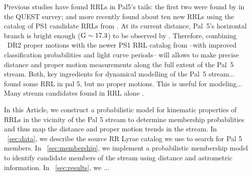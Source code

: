 \documentclass[twocolumn]{aastex63}
\begin{document}
Previous studies have found RRLs in Pal5's tails: the first two were found by \citet{Vivas:2001} in the QUEST survey; and more recently \citep{Ibata:2017} found about ten new RRLs using the catalog of PS1 candidate RRLs from \citet{Hernitschek:2016}. At its current distance, Pal~5's horizontal branch is bright enough (${\mathrm{G}}\sim17.3$) to be observed by \Gaia. Therefore, combining \Gaia~DR2 proper motions with the newer PS1 RRL catalog from \citet{Sesar:2017b} --with improved classification probabilities and light curve periods--  will allows to make precise distance and proper motion measurements along the full extent of the Pal~5 stream. Both, key ingredients for dynamical modelling of the Pal~5 stream...
\citep{Ibata:2017} found some RRL in pal 5, but no proper motions.
This is useful for modeling...
Many stream candidates found in RRL alone \citep{Mateu:2018}.


In this Article, we construct a probabilistic model for kinematic properties of RRLs in the vicinity of the Pal 5 stream to determine membership probabilities and thus map the distance and proper motion trends in the stream.
In \sectionname~\ref{sec:data}, we describe the source RR Lyrae catalog we use to search for Pal 5 members.
In \sectionname~\ref{sec:membership}, we implement a probabilistic membership model to identify candidate members of the stream using distance and astrometric information.
In \sectionname~\ref{sec:results}, we ...
\end{document}
